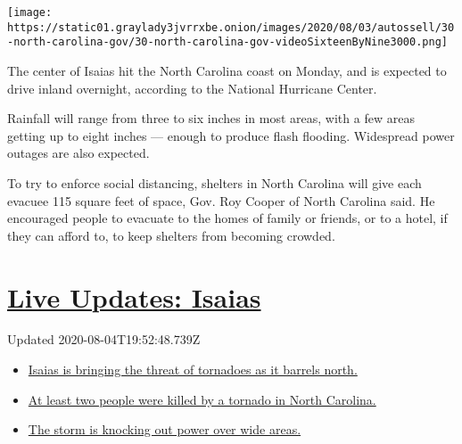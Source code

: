 \texttt{[image: https://static01.graylady3jvrrxbe.onion/images/2020/08/03/autossell/30-north-carolina-gov/30-north-carolina-gov-videoSixteenByNine3000.png]}

The center of Isaias hit the North Carolina coast on Monday, and is
expected to drive inland overnight, according to the National Hurricane
Center.

Rainfall will range from three to six inches in most areas, with a few
areas getting up to eight inches --- enough to produce flash flooding.
Widespread power outages are also expected.

To try to enforce social distancing, shelters in North Carolina will
give each evacuee 115 square feet of space, Gov. Roy Cooper of North
Carolina said. He encouraged people to evacuate to the homes of family
or friends, or to a hotel, if they can afford to, to keep shelters from
becoming crowded.

\hypertarget{live-updates-isaias}{%
\section{\texorpdfstring{\href{https://www.nytimes3xbfgragh.onion/2020/08/04/us/isaias-storm-updates.html?action=click\&pgtype=Article\&state=default\&region=MAIN_CONTENT_1\&context=storylines_live_updates}{Live
Updates: Isaias}}{Live Updates: Isaias}}\label{live-updates-isaias}}

Updated 2020-08-04T19:52:48.739Z

\begin{itemize}
\tightlist
\item
  \href{https://www.nytimes3xbfgragh.onion/2020/08/04/us/isaias-storm-updates.html?action=click\&pgtype=Article\&state=default\&region=MAIN_CONTENT_1\&context=storylines_live_updates\#link-362830dd}{Isaias
  is bringing the threat of tornadoes as it barrels north.}
\item
  \href{https://www.nytimes3xbfgragh.onion/2020/08/04/us/isaias-storm-updates.html?action=click\&pgtype=Article\&state=default\&region=MAIN_CONTENT_1\&context=storylines_live_updates\#link-7961bdbc}{At
  least two people were killed by a tornado in North Carolina.}
\item
  \href{https://www.nytimes3xbfgragh.onion/2020/08/04/us/isaias-storm-updates.html?action=click\&pgtype=Article\&state=default\&region=MAIN_CONTENT_1\&context=storylines_live_updates\#link-34e5d4e4}{The
  storm is knocking out power over wide areas.}
\end{itemize}


